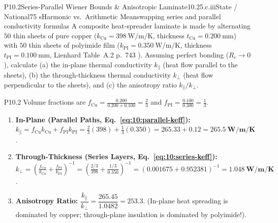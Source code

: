\begin{problem}{P10.2}{Series-Parallel Wiener Bounds \& Anisotropic Laminate}{10.2}{5.c.iii}{State / National}{75 s}{Harmonic vs.\ Arithmetic Mean}{swapping series and parallel conductivity formulas}
A composite heat-spreader laminate is made by alternating $50$ thin sheets of pure copper ($k_{\mathrm{Cu}} = \SI{398}{\watt\per\meter\per\kelvin}$, thickness $t_{\mathrm{Cu}} = \SI{0.200}{\milli\meter}$) with $50$ thin sheets of polyimide film ($k_{\mathrm{PI}} = \SI{0.350}{\watt\per\meter\per\kelvin}$, thickness $t_{\mathrm{PI}} = \SI{0.100}{\milli\meter}$, Lienhard Table~A.2 p.~743 ). Assuming perfect bonding ($R_c \to 0$), calculate (a) the in-plane thermal conductivity $k_{\parallel}$ (heat flow parallel to the sheets), (b) the through-thickness thermal conductivity $k_{\perp}$ (heat flow perpendicular to the sheets), and (c) the anisotropy ratio $k_{\parallel} / k_{\perp}$.
\end{problem}
\begin{solution}{P10.2}
Volume fractions are $f_{\mathrm{Cu}} = \frac{0.200}{0.200 + 0.100} = \frac{2}{3}$ and $f_{\mathrm{PI}} = \frac{0.100}{0.300} = \frac{1}{3}$.
\begin{enumerate}
  \item[(a)] \textbf{In-Plane (Parallel Paths, Eq.~\ref{eq:10:parallel-keff}):} $k_{\parallel} = f_{\mathrm{Cu}} k_{\mathrm{Cu}} + f_{\mathrm{PI}} k_{\mathrm{PI}} = \frac{2}{3}(398) + \frac{1}{3}(0.350) = 265.33 + 0.12 = \mathbf{\SI{265.5}{\watt\per\meter\per\kelvin}}$.
  \item[(b)] \textbf{Through-Thickness (Series Layers, Eq.~\ref{eq:10:series-keff}):} $k_{\perp} = \left(\frac{f_{\mathrm{Cu}}}{k_{\mathrm{Cu}}} + \frac{f_{\mathrm{PI}}}{k_{\mathrm{PI}}}\right)^{-1} = \left(\frac{2/3}{398} + \frac{1/3}{0.350}\right)^{-1} = \left(0.001675 + 0.952381\right)^{-1} = \mathbf{\SI{1.048}{\watt\per\meter\per\kelvin}}$.
  \item[(c)] \textbf{Anisotropy Ratio:} $\dfrac{k_{\parallel}}{k_{\perp}} = \dfrac{265.45}{1.0482} = \mathbf{253.3}$. (In-plane heat spreading is dominated by copper; through-plane insulation is dominated by polyimide!).
\end{enumerate}
\end{solution}

